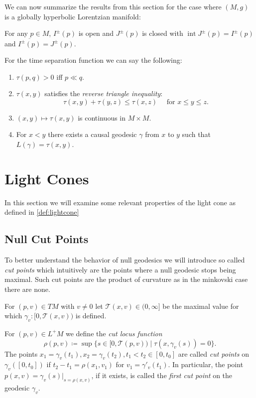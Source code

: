 \begin{remark}\label{rmk:causalitysummary}
We can now summarize the results from this section for the case where $(M,g)$ is a globally hyperbolic Lorentzian manifold:

For any $p\in M$, $I^\pm(p)$ is open and $J^\pm(p)$ is closed with $\operatorname{int} J^\pm(p) = I^\pm(p)$ and $\overline{I^\pm(p)}=J^\pm(p)$.

For the time separation function we can say the following:
\begin{enumerate}[label={\textnormal{(\arabic*)}}]
    \item $\tau(p,q)>0$ iff $p\ll q$.
    \item $\tau(x,y)$ satisfies the \emph{reverse triangle inequality}:
    \[
    \tau(x,y) + \tau(y,z) \leq \tau(x,z) \quad \text{ for }x\leq y\leq z.
    \]
    \item $(x,y)\mapsto \tau(x,y)$ is continuous in $M\times M$.
    \item For $x<y$ there exists a causal geodesic $\gamma$ from $x$ to $y$ such that $L(\gamma)=\tau(x,y)$.
\end{enumerate}

\end{remark}


\section{Light Cones}

In this section we will examine some relevant properties of the light cone as defined in \ref{def:lightcone}

\subsection{Null Cut Points}
To better understand the behavior of null geodesics we will introduce so called \emph{cut points} which intuitively are the points where a null geodesic stops being maximal. Such cut points are the product of curvature as in the minkovski case there are none.

For $(p,v)\in TM$ with $v\neq 0$ let $\mathcal{T}(x,v)\in(0,\infty]$ be the maximal value for which $\gamma_v:[0,\mathcal{T}(x,v))$ is defined.

\begin{definition}\label{def:cutpoint}
For $(p,v)\in L^+M$ we define the \emph{cut locus function}
\[
\rho(p,v)\coloneqq\sup\{s\in[0,\mathcal{T}(p,v)) \mid \tau(x,\gamma_v(s))=0\}.
\]
The points $x_1=\gamma_v(t_1), x_2=\gamma_v(t_2), t_1<t_2 \in [0,t_0]$ are called \emph{cut points} on $\gamma_v([0,t_0])$ if $t_2-t_1 = \rho(x_1,v_1)$ for $v_1 = \gamma'_v(t_1)$. In particular, the point $p(x,v) = \gamma_v(s)\rvert_{s=\rho(x,v)}$, if it exists, is called the \emph{first cut point} on the geodesic $\gamma_v$.
\end{definition}

